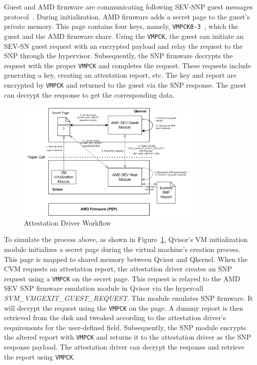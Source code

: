 Guest and AMD firmware are communicating following SEV-SNP guest messages protocol~\cite*{snp_firmware}. During initialization, AMD firmware adds a secret page to the guest's private memory. This page contains four keys, namely, \texttt{VMPCK0-3}~\cite*{snp_firmware}, which the guest and the 
AMD firmware share. Using the \texttt{VMPCK},  the guest can initiate an SEV-SN guest request with an encrypted payload and relay the request to the SNP through the hypervisor. Subsequently, the SNP firmware decrypts the request with the proper \texttt{VMPCK} and completes the request. 
These requests include generating a key, creating an attestation report, etc. The key and report are encrypted by \texttt{VMPCK} and returned to the guest via the SNP response. The guest can decrypt the response to get the corresponding data.

\begin{figure}[htp]
    \centering
    \includegraphics[width=0.8\textwidth]{images/amd_snp_driver.png}
    \caption[Attestation Driver Workflow]{Attestation Driver Workflow}
    \label{fig:amd_snp_driver}
\end{figure}

To simulate the process above, as shown in Figure~\ref{fig:amd_snp_driver}, Qvisor's VM initialization module initializes a secret page during the virtual machine's creation process. This page is mapped to shared memory between Qvisor and Qkernel. When the \acrshort{CVM} requests an attestation 
report, the attestation driver creates an  SNP request using a \texttt{VMPCK} on the secret page. This request is relayed to the AMD SEV SNP firmware emulation module in Qvisor via the hypercall \emph{SVM\_VMGEXIT\_GUEST\_REQUEST}. This module emulates SNP firmware. It will decrypt the request 
using the \texttt{VMPCK} on the page. A dummy report is then retrieved from the disk and tweaked according to the attestation driver's requirements for the user-defined field. Subsequently, the SNP module encrypts the altered report with \texttt{VMPCK} and returns it to the attestation driver as 
the SNP response payload. The attestation driver can decrypt the response and retrieve the report using \texttt{VMPCK}.

